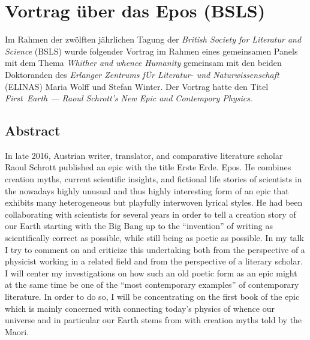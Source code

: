
\chapter{Vortrag über das Epos (BSLS)}
Im Rahmen der zwölften jährlichen Tagung der \emph{British Society for
Literatur and Science} (BSLS) wurde folgender Vortrag im Rahmen eines 
  gemeinsamen Panels mit dem Thema \emph{Whither and whence Humanity} 
  gemeinsam mit den beiden Doktoranden des \emph{Erlanger Zentrums fÜr
  Literatur- und Naturwissenschaft} (ELINAS) Maria Wolff und Stefan Winter.
Der Vortrag hatte den Titel \emph{First~Earth --- Raoul Schrott’s New Epic
  and Contempory Physics}.

\section{Abstract}
In late 2016, Austrian writer, translator, and comparative literature
  scholar Raoul Schrott published an epic with the title Erste Erde. Epos. 
He combines creation myths, current scientific insights, and fictional life
  stories of scientists in the nowadays highly unusual and thus highly
  interesting form of an epic that exhibits many heterogeneous but playfully
  interwoven lyrical styles. 
He had been collaborating with scientists for several years in order to tell
  a creation story of our Earth starting with the Big Bang up to the
  “invention” of writing as scientifically correct as possible, while still
  being as poetic as possible.
In my talk I try to comment on and criticize this undertaking both from the
  perspective of a physicist working in a related field and from the
  perspective of a literary scholar.
I will center my investigations on how such an old poetic form as an epic
  might at the same time be one of the “most contemporary examples” of
  contemporary literature.
In order to do so, I will be concentrating on the first book of the epic
  which is mainly concerned with connecting today’s physics of whence our
  universe and in particular our Earth stems from with creation myths told
  by the Maori.

